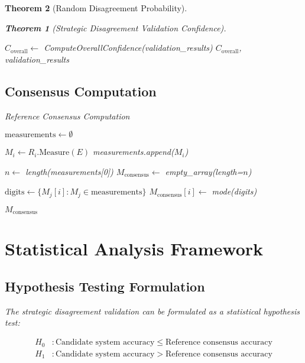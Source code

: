 \documentclass[12pt,a4paper]{article}
\newtheorem{theorem}{Theorem}
\begin{document}
\begin{theorem}[Random Disagreement Probability]
\begin{theorem}[Strategic Disagreement Validation Confidence]
\begin{algorithm}[H]
\begin{algorithmic}[1]
    \State $C_{\text{overall}} \gets$ ComputeOverallConfidence(validation\_results)
    \State \Return $C_{\text{overall}}$, validation\_results
\EndProcedure
\end{algorithmic}
\end{algorithm}

\subsection{Consensus Computation}

\begin{algorithm}[H]
\caption{Reference Consensus Computation}
\label{alg:consensus_computation}
\begin{algorithmic}[1]
    \State $\text{measurements} \gets \emptyset$

        \State $M_i \gets R_i.\text{Measure}(E)$
        \State measurements.append($M_i$)
    \EndFor

    \State $n \gets$ length(measurements[0])  
    \State $M_{\text{consensus}} \gets$ empty\_array(length=$n$)

        \State $\text{digits} \gets \{M_j[i] : M_j \in \text{measurements}\}$
        \State $M_{\text{consensus}}[i] \gets$ mode(digits)
    \EndFor

    \State \Return $M_{\text{consensus}}$
\EndProcedure
\end{algorithmic}
\end{algorithm}

\section{Statistical Analysis Framework}

\subsection{Hypothesis Testing Formulation}

The strategic disagreement validation can be formulated as a statistical hypothesis test:

\begin{align}
H_0&: \text{Candidate system accuracy} \leq \text{Reference consensus accuracy} \\
H_1&: \text{Candidate system accuracy} > \text{Reference consensus accuracy}
\end{align}


\end{theorem}
\end{theorem}
\end{document}
